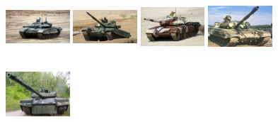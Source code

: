 \begin{figure}[H]
\subcaptionbox{}
  {\includegraphics[height=2.4cm, width=2.4cm]{images/real-images/tank/1.jpg}}
\subcaptionbox{}%
  {\includegraphics[height=2.4cm, width=2.4cm]{images/real-images/tank/2.jpg}}
\subcaptionbox{}%
  {\includegraphics[height=2.4cm, width=2.4cm]{images/real-images/tank/3.jpg}}
\subcaptionbox{}
  {\includegraphics[height=2.4cm, width=2.4cm]{images/real-images/tank/4.jpg}}
\subcaptionbox{}%
  {\includegraphics[height=2.4cm, width=2.4cm]{images/real-images/tank/5.jpg}}


\end{figure}
